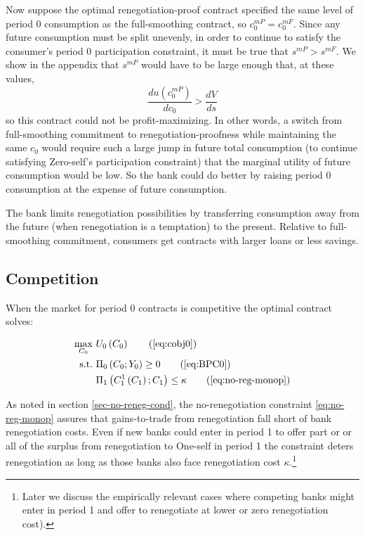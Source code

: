 \documentclass[11pt,english]{article}
\theoremstyle{plain}
\theoremstyle{definition}
\begin{document}
Now suppose the optimal renegotiation-proof contract specified the
same level of period 0 consumption as the full-smoothing contract,
so $c_{0}^{mP}=c_{0}^{mF}$. Since any future consumption must be
split unevenly, in order to continue to satisfy the consumer's period
0 participation constraint, it must be true that $s^{mP}>$$s^{mF}$.
We show in the appendix that $s^{mP}$ would have to be large enough
that, at these values, 
\begin{equation}
\frac{du\left(c_{0}^{mP}\right)}{dc_{0}}>\frac{dV}{ds}
\end{equation}
so this contract could not be profit-maximizing. In other words, a
switch from full-smoothing commitment to renegotiation-proofness while
maintaining the same $c_{0}$ would require such a large jump in future
total consumption (to continue satisfying Zero-self's participation
constraint) that the marginal utility of future consumption would
be low. So the bank could do better by raising period 0 consumption
at the expense of future consumption.

The bank limits renegotiation possibilities by transferring consumption
away from the future (when renegotiation is a temptation) to the present.
Relative to full-smoothing commitment, consumers get contracts with
larger loans or less savings.

\subsection{Competition}

When the market for period 0 contracts is competitive the optimal
contract solves:

\begin{align}
\max_{C_{0}} & \ U_{0}\left(C_{0}\right)\tag{\ref{eq:cobj0}}\\
\text{s.t.} & \ \Pi_{0}\left(C_{0};Y_{0}\right)\geq0\tag{\ref{eq:BPC0}}\\
 & \ \Pi_{1}\left(C_{1}^{1}\left(C_{1}\right);C_{1}\right)\leq\kappa\tag{\ref{eq:no-reg-monop}}
\end{align}

As noted in section \ref{sec-no-reneg-cond}, the no-renegotiation
constraint \ref{eq:no-reg-monop} assures that gains-to-trade from
renegotiation fall short of bank renegotiation costs. Even if new
banks could enter in period 1 to offer part or or all of the surplus
from renegotiation to One-self in period 1 the constraint deters renegotiation
as long as those banks also face renegotiation cost $\kappa$.\footnote{Later we discuss the empirically relevant cases where competing banks
might enter in period 1 and offer to renegotiate at lower or zero
renegotiation cost).}
\end{document}
